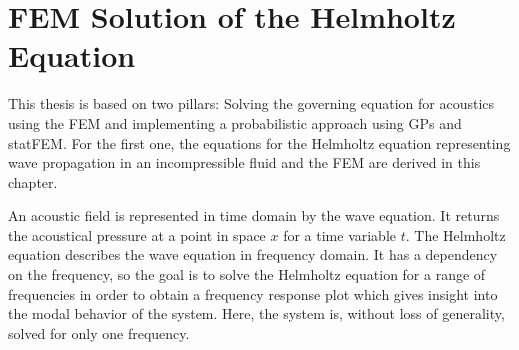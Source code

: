 \documentclass[%
  a4paper,oneside,%
  11pt,%
  smallchapters,
  style=printdev,
  extramargin,
  green,%
  rgb, <cmyk>
  ]{tubsbook}
\begin{document}
\chapter{FEM Solution of the Helmholtz Equation}
This thesis is based on two pillars: Solving the governing equation for acoustics using the FEM and implementing a probabilistic approach using GPs and statFEM. For the first one, the equations for the Helmholtz equation representing wave propagation in an incompressible fluid and the FEM are derived in this chapter.

An acoustic field is represented in time domain by the wave equation. It returns the acoustical pressure at a point in space $x$ for a time variable $t$.
The Helmholtz equation describes the wave equation in frequency domain. It has a dependency on the frequency, so the goal is to solve the Helmholtz equation for a range of frequencies in order to obtain a frequency response plot which gives insight into the modal behavior of the system. Here, the system is, without loss of generality, solved for only one frequency.
\end{document}
